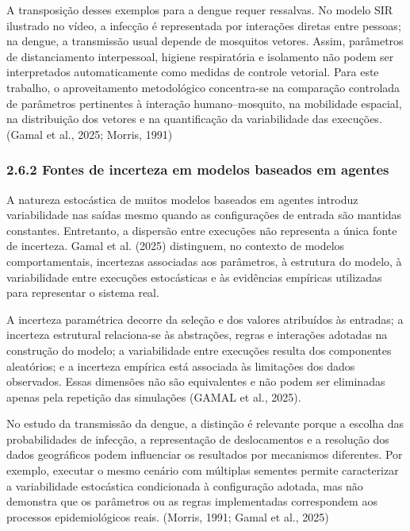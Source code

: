 A transposição desses exemplos para a dengue requer ressalvas. No modelo
SIR ilustrado no vídeo, a infecção é representada por interações diretas
entre pessoas; na dengue, a transmissão usual depende de mosquitos
vetores. Assim, parâmetros de distanciamento interpessoal, higiene
respiratória e isolamento não podem ser interpretados automaticamente
como medidas de controle vetorial. Para este trabalho, o aproveitamento
metodológico concentra-se na comparação controlada de parâmetros
pertinentes à interação humano--mosquito, na mobilidade espacial, na
distribuição dos vetores e na quantificação da variabilidade das
execuções. (Gamal et al., 2025; Morris, 1991)

\subsubsection{2.6.2 Fontes de incerteza em modelos baseados em
agentes}\label{fontes-de-incerteza-em-modelos-baseados-em-agentes}

A natureza estocástica de muitos modelos baseados em agentes introduz
variabilidade nas saídas mesmo quando as configurações de entrada são
mantidas constantes. Entretanto, a dispersão entre execuções não
representa a única fonte de incerteza. Gamal et al. (2025) distinguem,
no contexto de modelos comportamentais, incertezas associadas aos
parâmetros, à estrutura do modelo, à variabilidade entre execuções
estocásticas e às evidências empíricas utilizadas para representar o
sistema real.

A incerteza paramétrica decorre da seleção e dos valores atribuídos às
entradas; a incerteza estrutural relaciona-se às abstrações, regras e
interações adotadas na construção do modelo; a variabilidade entre
execuções resulta dos componentes aleatórios; e a incerteza empírica
está associada às limitações dos dados observados. Essas dimensões não
são equivalentes e não podem ser eliminadas apenas pela repetição das
simulações (GAMAL et al., 2025).

No estudo da transmissão da dengue, a distinção é relevante porque a
escolha das probabilidades de infecção, a representação de deslocamentos
e a resolução dos dados geográficos podem influenciar os resultados por
mecanismos diferentes. Por exemplo, executar o mesmo cenário com
múltiplas sementes permite caracterizar a variabilidade estocástica
condicionada à configuração adotada, mas não demonstra que os parâmetros
ou as regras implementadas correspondem aos processos epidemiológicos
reais. (Morris, 1991; Gamal et al., 2025)

